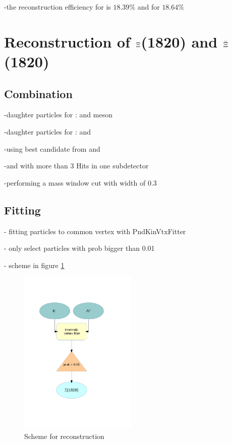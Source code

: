 		-the reconstruction efficiency for \anticascade is $18.39\%$ and for \cascade $18.64\%$
		
	
	
	

\section{Reconstruction of $\boldmath{\Xi}$(1820) and $\boldmath{\bar{\Xi}}$(1820)}
		\subsection*{Combination}

		
		-daughter particles for \excitedcascade: \lam and \kminus meson
		
		-daughter particles for \excitedanticascade: \alam and \kplus 
		
		-using best candidate from \lam and \alam
		
		-\kplus and \kminus with more than 3 Hits in one subdetector 
		
		-performing a mass window cut with width of $0.3$\massunit 
		
		
	\subsection*{Fitting}
	
		- fitting particles to common vertex with PndKinVtxFitter
		
		- only select particles with prob bigger than 0.01
		
		- scheme in figure \ref{fig:excitedcascade_scheme}
		
		\begin{figure}
			\centering
				\includegraphics[width=0.50\textwidth]{./plots/combineExcitedCascade.pdf}
			\caption{Scheme for \excitedcascade reconstruction}
			\label{fig:excitedcascade_scheme}
		\end{figure}
		
